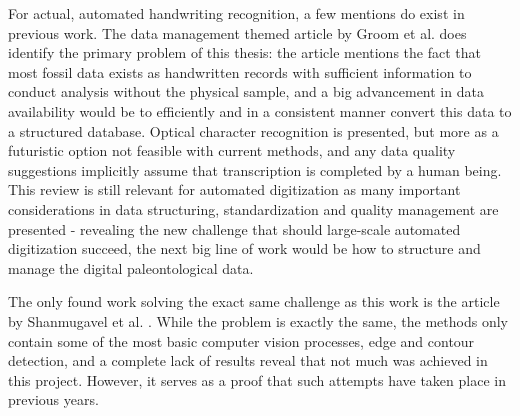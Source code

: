 \documentclass{article}
\begin{document}
For actual, automated handwriting recognition, a few mentions do exist in previous work. The data management themed 
article by Groom et al. \cite{groomImprovedStandardizationTranscribed2019} does identify the primary 
problem of this thesis: the article mentions the fact that most fossil data exists as handwritten records with sufficient information 
to conduct analysis without the physical sample, and a big advancement in data availability would be to efficiently and in a consistent 
manner convert this data to a structured database. Optical character recognition is presented, but more as a futuristic option 
not feasible with current methods, and any data quality suggestions implicitly assume that transcription is completed 
by a human being. This review is still relevant for automated digitization as many important considerations in data structuring,
standardization and quality management are presented - revealing the new challenge that should large-scale automated digitization succeed,
the next big line of work would be how to structure and manage the digital paleontological data.

The only found work solving the exact same challenge as this work is the article by Shanmugavel et al. \cite{shanmugavelHandwrittenOpticalCharacter2018}.
While the problem is exactly the same, the methods only contain some of the most basic computer 
vision processes, edge and contour detection, and a complete lack of results reveal that not much was achieved in 
this project. However, it serves as a proof that such attempts have taken place in previous years.
\end{document}
